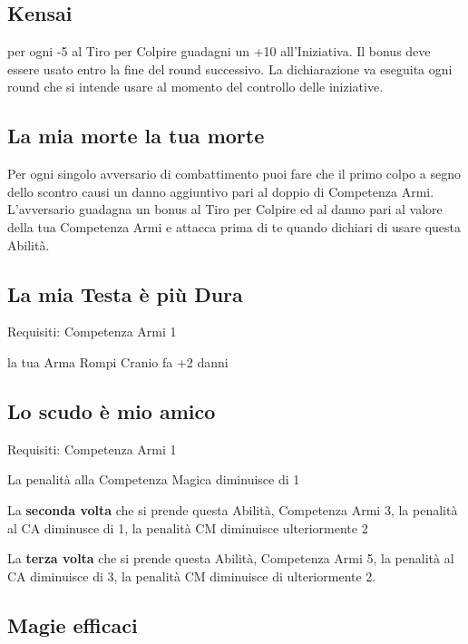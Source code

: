 \documentclass[a4paper,11pt,twoside,openany]{book}
\begin{document}
\subsection{Kensai}

per ogni -5 al Tiro per Colpire guadagni un +10 all'Iniziativa. Il bonus deve essere usato entro la fine del round successivo. La dichiarazione va eseguita ogni round che si intende usare al momento del controllo delle iniziative.

\subsection{La mia morte la tua morte}

Per ogni singolo avversario di combattimento puoi fare che il primo colpo a segno dello scontro causi un danno aggiuntivo pari al doppio di Competenza Armi. L'avversario guadagna un bonus al Tiro per Colpire ed al danno pari al valore della tua Competenza Armi e attacca prima di te quando dichiari di usare questa Abilità.

\subsection{La mia Testa è più Dura}

Requisiti: Competenza Armi 1

la tua Arma Rompi Cranio fa +2 danni

\subsection{Lo scudo è mio amico}

Requisiti: Competenza Armi 1

La penalità alla Competenza Magica diminuisce di 1

La \textbf{seconda volta} che si prende questa Abilità, Competenza Armi 3, la penalità al CA diminusce di 1, la penalità CM diminuisce ulteriormente 2

La \textbf{terza volta} che si prende questa Abilità, Competenza Armi 5, la penalità al CA diminuisce di 3, la penalità CM diminuisce di ulteriormente 2.

\subsection{Magie efficaci}
\end{document}
